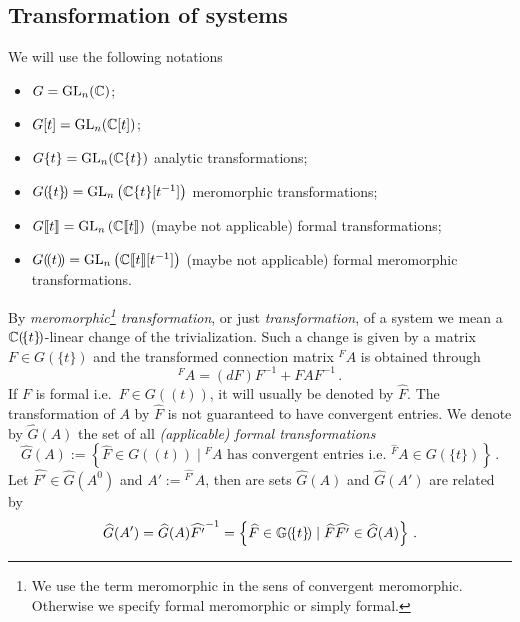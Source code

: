 \subsection{Transformation of systems}
\begin{notations}
  We will use the following notations
  \begin{itemize}
    \item $G=\operatorname{GL}_n(\mathbb{C})$;
    \item $G[t]=\operatorname{GL}_n(\mathbb{C}[t])$;
    \item $G\{t\}=\operatorname{GL}_n(\mathbb{C}\{t\})$ analytic transformations;
    \item $G(\!\{t\}\!)=\operatorname{GL}_n\left(\mathbb{C}\{t\}[t^{-1}]\right)$ meromorphic
      transformations;
    \item $G\llbracket t\rrbracket=\operatorname{GL}_n\left(\mathbb{C}\llbracket t\rrbracket\right)$
      (maybe not applicable) formal transformations;
    \item $G(\!(t)\!)=\operatorname{GL}_n\left(\mathbb{C}\llbracket t\rrbracket[t^{-1}]\right)$
      (maybe not applicable) formal meromorphic transformations.
  \end{itemize}
  \begin{comment}
    We will always use the meromorphic ones, in contrast
    to~\cite{boalch,thboalch} where analytic classification is used.
  \end{comment}
\end{notations}
By \emph{meromorphic\footnote{We use the term meromorphic in the sens of
convergent meromorphic. Otherwise we specify formal meromorphic or simply
formal.} transformation}, or just \emph{transformation}, of a system we mean a
$\mathbb{C}(\!\{t\}\!)$-linear change of the trivialization.  Such a change is given by
a matrix $F\in G(\!\{t\}\!)$ and the transformed connection matrix ${}^F\!A$ is
obtained through
\[
  {}^F\!A=(dF)F^{-1} + FAF^{-1} \,.
\]
If $F$ is formal i.e.\ $F\in G(\!(t)\!)$, it will usually be denoted by
$\hat F$.
The transformation of $A$ by $\hat F$ is not guaranteed to have convergent
entries.
We denote by $\hat G(A)$ the set of all \emph{(applicable) formal
transformations}
\[
  \hat G(A):=\left\{\hat F\in G(\!(t)\!)
    \mid {}^{\hat F}\!A \text{ has convergent entries i.e.\ }
    {}^{\hat F}\!A\in G(\!\{t\}\!)
  \right\}\,.
\]
Let $\hat{F'}\in\hat G(A^0)$ and $A':={}^{\hat{F'}}\!A$, then are sets $\hat
G(A)$ and $\hat G(A')$ are related by
\[
  \widehat G(A')=\widehat G(A)\widehat{F'}^{-1}=\left\{
    \widehat F\in\mathbb{G}(\!\{t\}\!) \mid \widehat F\widehat{F'}\in\widehat G(A)
  \right\} \,.
\]

